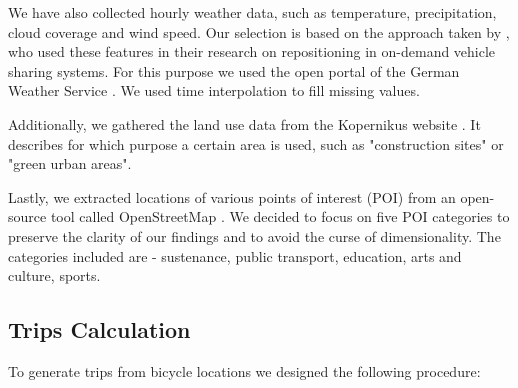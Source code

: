 We have also collected hourly weather data, such as temperature, precipitation,
cloud coverage and wind speed. Our selection is based on the approach taken by
, who used these features in their research on
repositioning in on-demand vehicle sharing systems. For this purpose we used
the open portal of the German Weather Service
.  We used time interpolation to fill missing
values.

Additionally, we gathered the land use data from the Kopernikus website . It describes for which purpose a certain area is used, such as "construction sites" or "green urban areas".

Lastly, we extracted locations of various points of interest (POI) from an open-source tool called  OpenStreetMap . We decided to focus on five POI categories to preserve the clarity of our findings and to avoid the curse of dimensionality. The categories included are - sustenance, public transport, education, arts and culture, sports.

\subsection{Trips Calculation}
To generate trips from bicycle locations we designed the following procedure:

